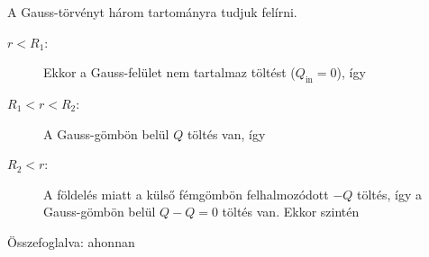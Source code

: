  A Gauss-törvényt három tartományra tudjuk felírni. 
 \begin{description}
   \item[$r<R_1$:] Ekkor a Gauss-felület nem tartalmaz töltést ($Q_\text{in}=0$), így
   
   \item[$R_1<r<R_2$:] A Gauss-gömbön belül $Q$ töltés van, így
    
   \item[$R_2<r$:] A földelés miatt a külső fémgömbön felhalmozódott $-Q$ töltés, így a Gauss-gömbön belül $Q-Q=0$ töltés van. Ekkor szintén
 \end{description}

 Összefoglalva:
 ahonnan
 
\fi